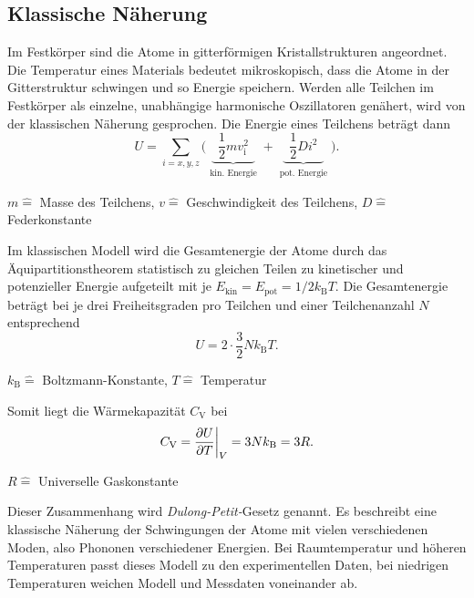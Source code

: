 \subsection{Klassische Näherung}
Im Festkörper sind die Atome in gitterförmigen Kristallstrukturen angeordnet.
Die Temperatur eines Materials bedeutet mikroskopisch, dass die Atome in der Gitterstruktur schwingen und so Energie speichern.
Werden alle Teilchen im Festkörper als einzelne, unabhängige harmonische Oszillatoren genähert, wird von der klassischen Näherung gesprochen.
Die Energie eines Teilchens beträgt dann
\begin{equation*}
	U = \sum_{i=x,y,z} \bigg( \underbrace{ \,\,\, \frac{1}{2}mv_{\text{i}}^2 \,\,\, }_{\substack{\text{kin. Energie}}} + \underbrace{ \,\,\, \frac{1}{2} D i^2 \,\,\, }_{\substack{\text{pot. Energie}}} \bigg).
\end{equation*}
\begin{center}
	\tiny{$m \widehat{=}$ Masse des Teilchens, $v \widehat{=}$ Geschwindigkeit des Teilchens, $D \widehat{=}$ Federkonstante}
\end{center}
Im klassischen Modell wird die Gesamtenergie der Atome durch das Äquipartitionstheorem statistisch zu gleichen Teilen zu kinetischer und potenzieller Energie aufgeteilt mit je $E_{\text{kin}} = E_{\text{pot}} = 1/2 k_{\text{B}} T $.
Die Gesamtenergie beträgt bei je drei Freiheitsgraden pro Teilchen und einer Teilchenanzahl $N$ entsprechend
\begin{equation*}
	U = 2 \cdot \frac{3}{2} N k_{\text{B}} T.
\end{equation*}
\begin{center}
	\tiny{$k_{\text{B}} \widehat{=}$ Boltzmann-Konstante, $T \widehat{=}$ Temperatur}
\end{center}
Somit liegt die Wärmekapazität $C_{\text{V}}$ bei
\begin{equation}
	C_{\text{V}} = \frac{\partial U}{\partial T} \bigg{\vert}_{V} = 3 N k_{\text{B}} = 3 R.
	\label{eqn:dulongpetit}
\end{equation}
\begin{center}
	\tiny{$R \widehat{=}$ Universelle Gaskonstante}
\end{center}
Dieser Zusammenhang wird \textit{Dulong-Petit-}Gesetz genannt.
Es beschreibt eine klassische Näherung der Schwingungen der Atome mit vielen verschiedenen Moden, also Phononen verschiedener Energien.
Bei Raumtemperatur und höheren Temperaturen passt dieses Modell zu den experimentellen Daten, bei niedrigen Temperaturen weichen Modell und Messdaten voneinander ab.

